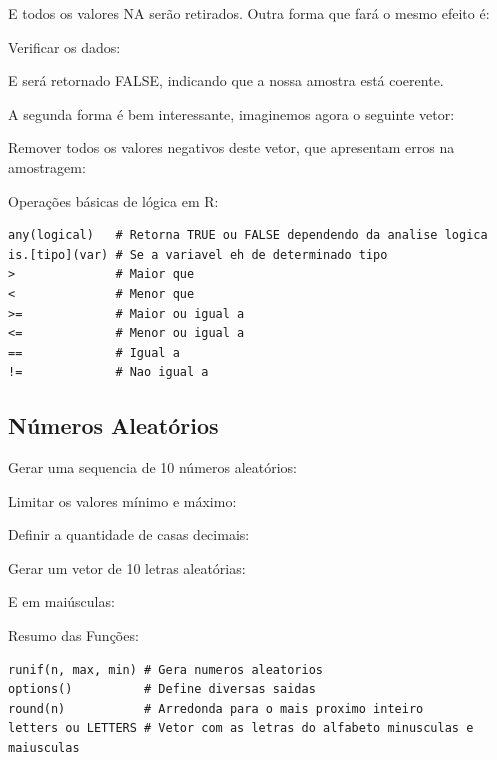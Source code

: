 \documentclass[a4paper,11pt]{article}
\begin{document}
E todos os valores NA serão retirados. Outra forma que fará o mesmo efeito é: \\

Verificar os dados: \\

E será retornado FALSE, indicando que a nossa amostra está coerente. 

A segunda forma é bem interessante, imaginemos agora o seguinte vetor: \\

Remover todos os valores negativos deste vetor, que apresentam erros na amostragem: \\

Operações básicas de lógica em R:
\begin{lstlisting}
any(logical)   # Retorna TRUE ou FALSE dependendo da analise logica
is.[tipo](var) # Se a variavel eh de determinado tipo
>              # Maior que
<              # Menor que
>=             # Maior ou igual a
<=             # Menor ou igual a
==             # Igual a
!=             # Nao igual a
\end{lstlisting}

\subsection{Números Aleatórios}
Gerar uma sequencia de 10 números aleatórios: \\

Limitar os valores mínimo e máximo: \\

Definir a quantidade de casas decimais: \\

Gerar um vetor de 10 letras aleatórias: \\

E em maiúsculas: \\

Resumo das Funções:
\begin{lstlisting}
runif(n, max, min) # Gera numeros aleatorios
options()          # Define diversas saidas
round(n)           # Arredonda para o mais proximo inteiro
letters ou LETTERS # Vetor com as letras do alfabeto minusculas e maiusculas
\end{lstlisting}
\end{document}
